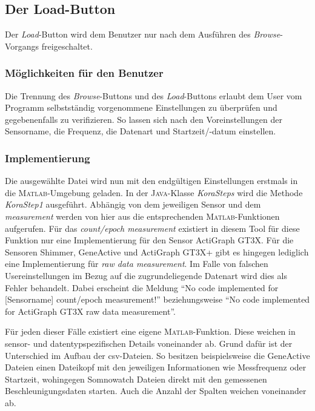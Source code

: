 \documentclass[onecolumn,german]{article}
\begin{document}
\subsection{Der Load-Button}\label{Der Load-Button}
Der \textit{Load}-Button wird dem Benutzer nur nach dem Ausführen des \textit{Browse}-Vorgangs freigeschaltet.

\subsubsection{Möglichkeiten für den Benutzer}
Die Trennung des \textit{Browse}-Buttons und des \textit{Load}-Buttons erlaubt dem User vom Programm selbstständig vorgenommene Einstellungen zu überprüfen und gegebenenfalls zu verifizieren. So lassen sich nach den Voreinstellungen der Sensorname, die Frequenz, die Datenart und Startzeit/-datum einstellen.

\subsubsection{Implementierung}
Die ausgewählte Datei wird nun mit den endgültigen Einstellungen erstmals in die \textsc{Matlab}-Umgebung geladen. In der \textsc{Java}-Klasse \textit{KoraSteps} wird die Methode \textit{KoraStep1} ausgeführt. Abhängig von dem jeweiligen Sensor und dem \textit{measurement} werden von hier aus die entsprechenden \textsc{Matlab}-Funktionen aufgerufen. Für das \textit{count/epoch measurement} existiert in diesem Tool für diese Funktion nur eine Implementierung für den Sensor ActiGraph GT3X. Für die Sensoren Shimmer, GeneActive und ActiGraph GT3X+ gibt es hingegen lediglich eine Implementierung für \textit{raw data measurement}. Im Falle von falschen Usereinstellungen im Bezug auf die zugrundeliegende Datenart wird dies als Fehler behandelt. Dabei erscheint die Meldung ``No code implemented for [Sensorname] count/epoch measurement!'' beziehungsweise ``No code implemented for ActiGraph GT3X raw data measurement''.\newline

Für jeden dieser Fälle existiert eine eigene \textsc{Matlab}-Funktion. Diese weichen in sensor- und datentypspezifischen Details voneinander ab. Grund dafür ist der Unterschied im Aufbau der csv-Dateien. So besitzen beispielsweise die GeneActive Dateien einen Dateikopf mit den jeweiligen Informationen wie Messfrequenz oder Startzeit, wohingegen Somnowatch Dateien direkt mit den gemessenen Beschleunigungsdaten starten. Auch die Anzahl der Spalten weichen voneinander ab.\newline
\end{document}
